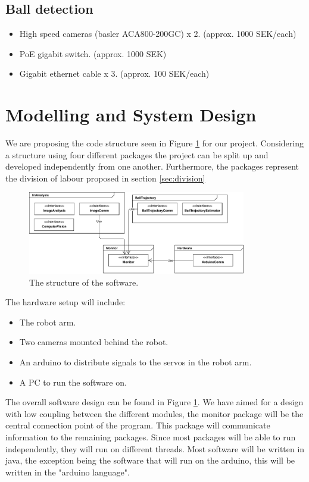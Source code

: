 \documentclass{article}
\begin{document}
\subsection{Ball detection}
    \begin{itemize}
        \item High speed cameras (basler ACA800-200GC) x 2. (approx. 1000 SEK/each)
        \item PoE gigabit switch. (approx. 1000 SEK)
        \item Gigabit ethernet cable x 3. (approx. 100 SEK/each)
    \end{itemize}

\section{Modelling and System Design}
We are proposing the code structure seen in Figure \ref{fig:uml} for our project. Considering a structure using four different packages the project can be split up and developed independently from one another. Furthermore, the packages represent the division of labour proposed in section \ref{sec:division}

\begin{figure}[b] 
	\centering
 	\includegraphics[width=0.85\textwidth]{figures/UML}
    \caption{The structure of the software.}
    \label{fig:uml}
\end{figure}

\noindent
The hardware setup will include:
\begin{itemize}
\item The robot arm.
\item Two cameras mounted behind the robot.
\item An arduino to distribute signals to the servos in the robot arm.
\item A PC to run the software on.
\end{itemize}
The overall software design can be found in Figure \ref{fig:uml}. We have aimed for a design with low coupling between the different modules, the monitor package will be the central connection point of the program. This package will communicate information to the remaining packages. Since most packages will be able to run independently, they will run on different threads. Most software will be written in java, the exception being the software that will run on the arduino, this will be written in the "arduino language".
\end{document}
